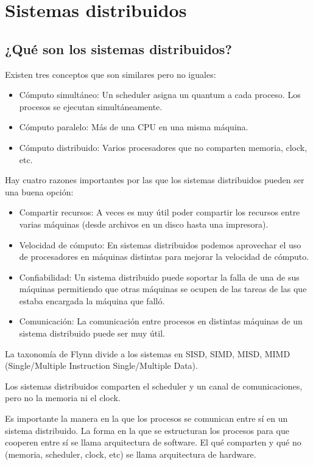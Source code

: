 \documentclass{article}
\begin{document}
\section{Sistemas distribuidos}

\subsection{¿Qu\'e son los sistemas distribuidos?}

Existen tres conceptos que son similares pero no iguales:

\begin{itemize}
\item C\'omputo simult\'aneo: Un scheduler asigna un quantum a cada proceso. Los procesos se ejecutan simult\'aneamente.
\item C\'omputo paralelo: M\'as de una CPU en una misma m\'aquina.
\item C\'omputo distribuido: Varios procesadores que no comparten memoria, clock, etc.
\end{itemize}

Hay cuatro razones importantes por las que los sistemas distribuidos pueden ser una buena opci\'on:

\begin{itemize}
\item Compartir recursos: A veces es muy \'util poder compartir los recursos entre varias m\'aquinas (desde archivos en un disco hasta una impresora).
\item Velocidad de c\'omputo: En sistemas distribuidos podemos aprovechar el uso de procesadores en m\'aquinas distintas para mejorar la velocidad de c\'omputo.
\item Confiabilidad: Un sistema distribuido puede soportar la falla de una de sus m\'aquinas permitiendo que otras m\'aquinas se ocupen de las tareas de las que estaba encargada la m\'aquina que fall\'o.
\item Comunicaci\'on: La comunicaci\'on entre procesos en distintas m\'aquinas de un sistema distribuido puede ser muy \'util.
\end{itemize}

La taxonom\'ia de Flynn divide a los sistemas en SISD, SIMD, MISD, MIMD (Single/Multiple Instruction Single/Multiple Data).

Los sistemas distribuidos comparten el scheduler y un canal de comunicaciones, pero no la memoria ni el clock.

Es importante la manera en la que los procesos se comunican entre s\'i en un sistema distribuido. La forma en la que se estructuran los procesos para que cooperen entre s\'i se llama arquitectura de software. El qu\'e comparten y qu\'e no (memoria, scheduler, clock, etc) se llama arquitectura de hardware.
\end{document}
